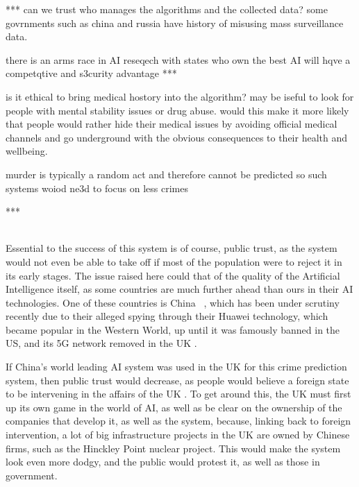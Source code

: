 *** can we trust who manages the algorithms and the collected data? 
some govrnments such as china and russia have history of misusing 
mass surveillance data. 

there is an arms race in AI reseqech with states who own the best AI will
hqve a competqtive and s3curity advantage ***

is it ethical to bring medical hostory into the algorithm? may be iseful to look for people with mental stability issues or drug abuse. would this make
it more likely that people would rather hide their medical issues by
avoiding official medical channels and go underground with the obvious 
consequences to their health and wellbeing.

murder is typically a random act and therefore cannot be predicted so
such systems woiod ne3d to focus on less crimes  



***







\\

Essential to the success of this system is of course, public trust, as the system would not even be able to take off
if most of the population were to reject it in its early stages.
The issue raised here could that of the quality of the Artificial Intelligence itself, as some countries are much
further ahead than ours in their AI technologies.
One of these countries is China ~\cite{ai-arms-race}, which has been under scrutiny recently due to their alleged
spying through their Huawei technology, which became popular in the Western World, up until it was famously banned in
the US, and its 5G network removed in the UK .

If China's world leading AI system was used in the UK for this crime prediction system, then public trust would
decrease, as people would believe a foreign state to be intervening in the affairs of the UK .
To get around this, the UK must first up its own game in the world of AI, as well as be clear on the ownership of the
companies that develop it, as well as the system, because, linking back to foreign intervention, a lot of big
infrastructure projects in the UK are owned by Chinese firms, such as the Hinckley Point nuclear project\cite{hinkley}.
This would make the system look even more dodgy, and the public would protest it, as well as those in government.
